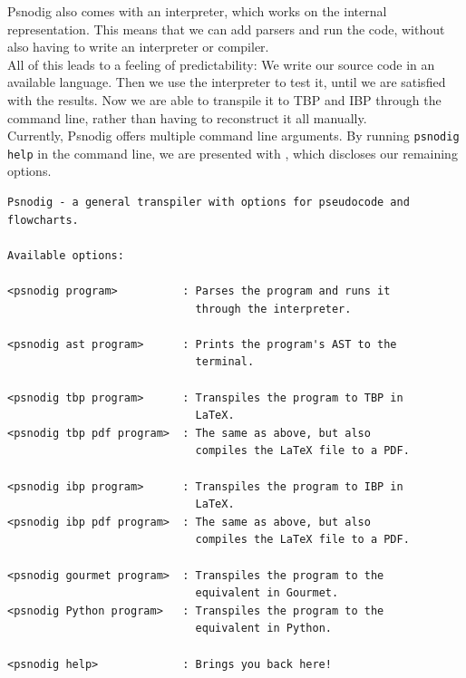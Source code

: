 Psnodig also comes with an interpreter, which works on the internal representation. This means that we can add parsers and run the code, without also having to write an interpreter or compiler. \\

All of this leads to a feeling of predictability: We write our source code in an available language. Then we use the interpreter to test it, until we are satisfied with the results. Now we are able to transpile it to TBP and IBP through the command line, rather than having to reconstruct it all manually. \\

Currently, Psnodig offers multiple command line arguments. By running \texttt{psnodig help} in the command line, we are presented with , which discloses our remaining options. \\

\begin{lstlisting}[caption={The command line options for Psnodig, presented by running \texttt{psnodig help} in the terminal.}, captionpos=b, label={psnodigCMDoptions}]
Psnodig - a general transpiler with options for pseudocode and flowcharts.

Available options:

<psnodig program>          : Parses the program and runs it
                             through the interpreter.

<psnodig ast program>      : Prints the program's AST to the
                             terminal.

<psnodig tbp program>      : Transpiles the program to TBP in
                             LaTeX.
<psnodig tbp pdf program>  : The same as above, but also
                             compiles the LaTeX file to a PDF.

<psnodig ibp program>      : Transpiles the program to IBP in
                             LaTeX.
<psnodig ibp pdf program>  : The same as above, but also
                             compiles the LaTeX file to a PDF.

<psnodig gourmet program>  : Transpiles the program to the
                             equivalent in Gourmet.
<psnodig Python program>   : Transpiles the program to the
                             equivalent in Python.

<psnodig help>             : Brings you back here!
\end{lstlisting}


